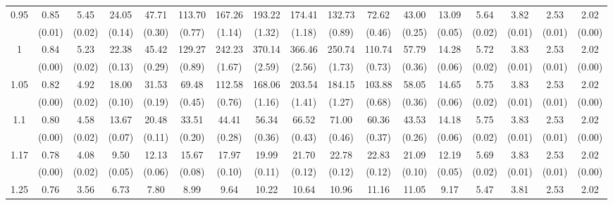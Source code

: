 \documentclass[12pt]{article}  %
\theoremstyle{plain}
\begin{document}
\begin{sidewaystable}[htbp]
\begin{tabular}{ccccccccccccccccc}
\multirow{2}{*}{0.95}  &0.85 &5.45 &24.05 &47.71 &113.70 &167.26& 193.22& 174.41 &132.73  &72.62 &43.00& 13.09 & 5.64  &3.82 & 2.53 & 2.02 \\                
					  & (0.01)& (0.02)& (0.14)& (0.30)& (0.77)& (1.14)& (1.32)& (1.18)& (0.89)&  (0.46)&  (0.25)&  (0.05)&  (0.02)&  (0.01)&  (0.01) &    (0.00)\\ \hline
\multirow{2}{*}{1}  & 0.84 &5.23 &22.38 &45.42& 129.27 &242.23& 370.14 &366.46& 250.74& 110.74 &57.79 &14.28 & 5.72  &3.83  &2.53&  2.02\\
                      & (0.00)& (0.02)& (0.13)& (0.29)& (0.89)& (1.67)& (2.59)& (2.56)& (1.73)&  (0.73)&  (0.36)&  (0.06)&  (0.02)&  (0.01)&  (0.01) &     (0.00)\\ \hline                                                                     
\multirow{2}{*}{1.05}  & 0.82 &4.92& 18.00 &31.53 & 69.48 &112.58& 168.06& 203.54& 184.15& 103.88& 58.05 &14.65 & 5.75 & 3.83 & 2.53 & 2.02\\
                      & (0.00)& (0.02)& (0.10)& (0.19)& (0.45)& (0.76)& (1.16)& (1.41)& (1.27)&  (0.68)&  (0.36)&  (0.06)&  (0.02)&  (0.01)&  (0.01)  &     (0.00)\\ \hline                                                                                                                                          
\multirow{2}{*}{1.1}  &0.80 &4.58& 13.67 &20.48&  33.51 & 44.41 & 56.34 & 66.52&  71.00 & 60.36& 43.53& 14.18 & 5.75 & 3.83 & 2.53 & 2.02\\
                      &  (0.00)& (0.02)& (0.07)& (0.11)& (0.20)& (0.28)& (0.36)& (0.43)& (0.46)&  (0.37)&  (0.26)&  (0.06)&  (0.02)&  (0.01)&  (0.01)  &     (0.00)\\ \hline
\multirow{2}{*}{1.17}  &0.78& 4.08 & 9.50& 12.13 & 15.67 & 17.97 & 19.99 & 21.70 & 22.78 & 22.83 &21.09& 12.19&  5.69 & 3.83 & 2.53 & 2.02\\
                      & (0.00)& (0.02)& (0.05)& (0.06)& (0.08)& (0.10)& (0.11)& (0.12)& (0.12)&  (0.12)&  (0.10)&  (0.05)&  (0.02)&  (0.01)&  (0.01)   &   (0.00)\\ \hline                                                                                                                                                                                                                                                                                    
                                                                     \multirow{2}{*}{1.25}  &0.76 &3.56 & 6.73 & 7.80 &  8.99  & 9.64 & 10.22 & 10.64 & 10.96 & 11.16 &11.05 & 9.17 & 5.47 & 3.81 & 2.53 & 2.02\\

\end{tabular}
\end{sidewaystable}
\end{document}

